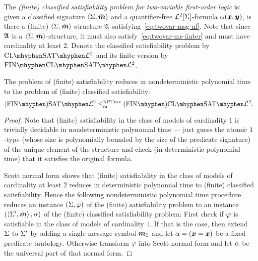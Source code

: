 \begin{definition}\label{def:clsig-twovar}
The \emph{(finite) classified satisfiability problem for two-variable
first-order logic} is:
given a classified signature $\left\langle \mathrm{\Sigma},\bar{\bm{m}} \right\rangle$ and a quantifier-free
$\mathcal{L}^{2}[\mathrm{\Sigma}]$-formula $\alpha(\bm{x},\bm{y})$, is there a (finite)
$\left\langle \mathrm{\Sigma},\bar{\bm{m}} \right\rangle$-structure $\mathfrak{A}$ satisfying~\cref{eq:twovar-msg-nf}.
Note that since $\mathfrak{A}$ is a $\left\langle \mathrm{\Sigma},\bar{\bm{m}} \right\rangle$-structure, it must also
satisfy~\cref{eq:twovar-ms-iinter} and must have cardinality at least $2$.
Denote the classified satisfiability problem by $\ClSat{\vFo2}$ and its finite
version by $\FinClSat{\vFo2}$.
\end{definition}

\begin{remark}
The problem of (finite) satisfiability reduces in nondeterministic polynomial
time to the problem of (finite) classified satisfiability:
\[
  \FinASat{\vFo2} \red\cNP \FinAClSat{\vFo2}.
\]
\end{remark}
\begin{proof}

Note that (finite) satisfiability in the class of models of cardinality $1$ is
trivially decidable in nondeterministic polynomial time --- just guess the
atomic $1$-type (whose size is polynomially bounded by the size of the
predicate signature) of the unique element of the structure and check (in
deterministic polynomial time) that it satisfies the original formula.

Scott normal form shows that (finite) satisfiability in the class of models of
cardinality at least $2$ reduces in deterministic polynomial time to (finite)
classified satisfiability.
Hence the following nondeterministic polynomial time procedure reduces an
instance $(\mathrm{\Sigma}, \varphi)$ of the (finite) satisfiability problem to an instance
$(\left\langle \mathrm{\Sigma'},\bar{\bm{m}} \right\rangle, \alpha)$ of the (finite) classified satisfiability problem:
First check if $\varphi$ is satisfiable in the class of models of cardinality $1$.
If that is the case, then extend $\mathrm{\Sigma}$ to $\mathrm{\Sigma'}$ by adding a single message
symbol $\bm{m}_{1}$ and let $\alpha = (\bm{x} = \bm{x})$ be a fixed predicate tautology.
Otherwise transform $\varphi$ into Scott normal form and let $\alpha$ be the
universal part of that normal form.
\end{proof}

